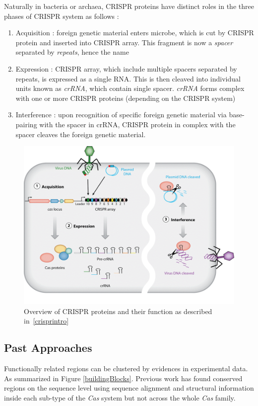 \documentclass[11pt, oneside]{article}
\begin{document}
Naturally in bacteria or archaea, CRISPR proteins have distinct roles in the three phases of CRISPR system as follows : 
\begin{enumerate}
\item Acquisition : foreign genetic material enters microbe, which is cut by CRISPR protein and inserted into CRISPR array. This fragment is now a \textit{spacer} separated by \textit{repeats}, hence the name
\item Expression : CRISPR array, which include multiple spacers separated by repeats, is expressed as a single RNA. This is then cleaved into individual units known as \textit{crRNA}, which contain single spacer. \textit{crRNA} forms complex with one or more CRISPR proteins (depending on the CRISPR system)
\item Interference : upon recognition of specific foreign genetic material via base-pairing with the spacer in crRNA, CRISPR protein in complex with the spacer cleaves the foreign genetic material. 
\end{enumerate}



\begin{figure}[ht]
  \centering
  \includegraphics[scale = 0.4]{images/crisprOverview}
      \caption{Overview of CRISPR proteins and their function as described in~\ref{crisprintro} ~\cite{annualreview}}
      \label{crisprOverview}
\end{figure}

\subsection{Past Approaches}
Functionally related regions can be clustered by evidences in experimental data. As summarized in Figure \ref{buildingBlocks}. Previous work has found conserved regions on the sequence level  using sequence alignment and structural information\cite{preWork} inside each sub-type of the \textit{Cas} system but not across the whole \textit{Cas} family.
\end{document}
